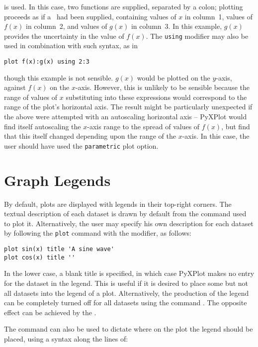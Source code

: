 \noindent is used. In this case, two functions are supplied, separated by a
colon; plotting proceeds as if a \datafile\ had been supplied, containing
values of $x$ in column~1, values of $f(x)$ in column~2, and values of $g(x)$
in column~3. In this example, $g(x)$ provides the uncertainty in the value of
$f(x)$.  The {\tt using} modifier may also be used in combination with such
syntax, as in

\begin{verbatim}
plot f(x):g(x) using 2:3
\end{verbatim}

\noindent though this example is not sensible. $g(x)$ would be plotted on the
$y$-axis, against $f(x)$ on the $x$-axis. However, this is unlikely to be
sensible because the range of values of $x$ substituting into these expressions
would correspond to the range of the plot's horizontal axis. The result might
be particularly unexpected if the above were attempted with an autoscaling
horizontal axis -- PyXPlot would find itself autoscaling the $x$-axis range to
the spread of values of $f(x)$, but find that this itself changed depending
upon the range of the $x$-axis. In this case, the user should have used the
{\tt parametric} plot option.

\section{Graph Legends}
\label{sec:legends}

By default, plots are displayed with legends in their top-right corners. The
textual description of each dataset is drawn by default from the command used
to plot it. Alternatively, the user may specify his own description for each
dataset by following the {\tt plot} command with the  modifier,
as follows:

\begin{verbatim}
plot sin(x) title 'A sine wave'
plot cos(x) title ''
\end{verbatim}

In the lower case, a blank title is specified, in which case PyXPlot makes no
entry for the dataset in the legend. This is useful if it is desired to place
some but not all datasets into the legend of a plot.  Alternatively, the
production of the legend can be completely turned off for all datasets using
the command . The opposite effect can be achieved by the
.

The  command can also be used to dictate where on the plot the
legend should be placed, using a syntax along the lines of:

